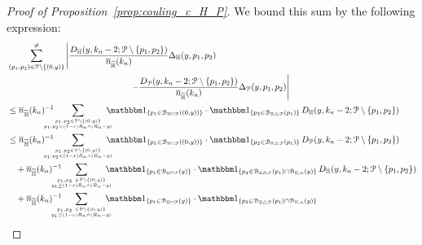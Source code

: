 \begin{proof}[Proof of Proposition~\ref{prop:couling_c_H_P}]
We bound this sum by the following expression:
\begin{align} 
&\sum_{(p_1,p_2) \in \Pcal \setminus \{(0,y)\}}^{\not =} 
  \left| \frac{D_{\H}(y,k_n-2; \Pcal \setminus \{p_1,p_2 \})}{\expH} \Delta_\H (y,p_1,p_2) \right. \notag \\
  & \hspace{5cm} \left. - \frac{D_{\Pcal} (y,k_n-2;\Pcal \setminus \{p_1,p_2\})}{\expH} \Delta_{\Pcal} (y,p_1,p_2)
   \right|  \notag \\
&\le \expH^{-1} \hspace{-15pt} \sum_{p_1,p_2\in \Pcal \setminus \{(0,y)\} \atop  y_1, y_2 < (1-\eps)R_n \wedge (R_n-y)} 
	\hspace{-10pt} \ind{p_1 \in \BallInter{(0,y)}} \cdot \ind{p_2 \in \BallSym{p_1}} 
	\, D_\H (y,k_n-2;\Pcal \setminus \{ p_1,p_2\}) \label{eq:sum_1}\\
&\le \expH^{-1} \hspace{-15pt} \sum_{p_1,p_2\in \Pcal \setminus \{(0,y)\} \atop  y_1, y_2 < (1-\eps)R_n \wedge (R_n-y)} 
	\hspace{-10pt} \ind{p_1 \in \BallInter{(0,y)}} \cdot \ind{p_2 \in \BallSym{p_1}} 
	\, D_\Pcal (y,k_n-2;\Pcal \setminus \{ p_1,p_2\}) \label{eq:sum_2}\\
&\hspace{10pt}+ \expH^{-1} \hspace{-15pt} \sum_{p_1,p_2 \ \in \Pcal \setminus \{(0,y) \} 
	\atop y_1 \geq (1-\eps) R_n \wedge (R_n-y)} \hspace{-10pt}
	\ind{p_1 \in \BallInter{y}} \cdot \ind{p_2 \in \BallSym{p_1}\cap \BallHyp{y}} 
	\, D_\H (y,k_n-2;\Pcal \setminus \{ p_1,p_2\}) \label{eq:sum_3} \\
&\hspace{10pt}+ \expH^{-1} \hspace{-15pt} \sum_{p_1,p_2 \ \in \Pcal \setminus \{(0,y) \} 
	\atop y_1 \geq (1-\eps) R_n \wedge (R_n-y)} \hspace{-10pt}
	\ind{p_1 \in \BallInter{y}} \cdot \ind{p_2 \in \BallSym{p_1}\cap \BallHyp{y}} 

\end{align}
\end{proof}
